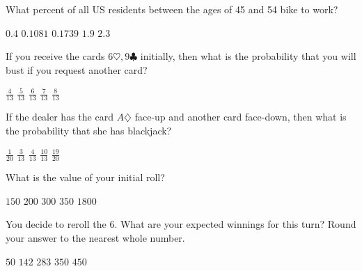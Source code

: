 \documentclass[answers,12pt]{exam}
\begin{document}
\begin{questions}
\question\label{LastWalk}
What percent of all US residents between the ages
of 45 and 54 bike to work?\\
\begin{oneparchoices}
\correctchoice $0.4$
\choice $0.1081$ %
\choice $0.1739$ %
\choice $1.9$ %
\choice $2.3$ %
\end{oneparchoices}


\question\label{FirstBJ}
If you receive the cards $6\heartsuit,9\clubsuit$
initially, then what is the probability that you will bust if you
request another card?\\
\begin{oneparchoices}
\choice $\frac{4}{13}$
\choice $\frac{5}{13}$
\choice $\frac{6}{13}$ %
\correctchoice $\frac{7}{13}$
\choice $\frac{8}{13}$ %
\end{oneparchoices}

\question\label{LastBJ}
If the dealer has the card $A\diamondsuit$
face-up and another card face-down, then what is the probability
that she has blackjack?\\
\begin{oneparchoices}
\choice $\frac{1}{20}$ %
\choice $\frac{3}{13}$ %
\correctchoice $\frac{4}{13}$
\choice $\frac{10}{13}$
\choice $\frac{19}{20}$ %
\end{oneparchoices}


\question\label{FirstF}
What is the value of your initial roll?\\
\begin{oneparchoices}
\choice $150$ %
\choice $200$ %
\choice $300$ %
\correctchoice $350$
\choice $1800$ %
\end{oneparchoices}

\question\label{LastF}
You decide to reroll the $6$. What are your expected
winnings for this turn? Round your answer to the nearest whole number.\\
\begin{oneparchoices}
\choice $50$ %
\correctchoice $142$
\choice $283$ %
\choice $350$ %
\choice $450$ %
\end{oneparchoices}


\end{questions}
\end{document}
